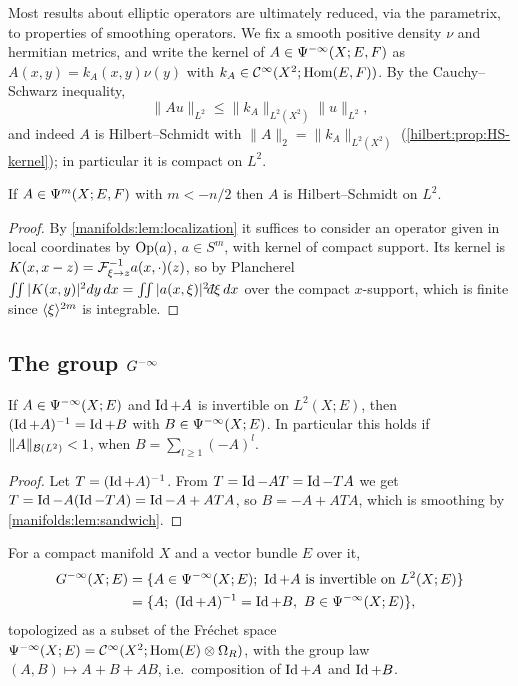 Most results about elliptic operators are ultimately reduced, via the parametrix,
to properties of smoothing operators. We fix a smooth positive density $\nu$ and
hermitian metrics, and write the kernel of $A\in\Psi^{-\infty}(X;E,F)$ as
$A(x,y)=k_A(x,y)\nu(y)$ with $k_A\in\mathcal{C}^\infty(X^2;\operatorname{Hom}(E,F))$. By the Cauchy--Schwarz
inequality,
\begin{equation}\label{manifolds:eq:HS-bound}
\|Au\|_{L^2}\le\|k_A\|_{L^2(X^2)}\|u\|_{L^2},
\end{equation}
and indeed $A$ is Hilbert--Schmidt with $\|A\|_{2}=\|k_A\|_{L^2(X^2)}$
(\cref{hilbert:prop:HS-kernel}); in particular it is compact on $L^2$.

\begin{lemma}\label{manifolds:lem:HS}
If $A\in\Psi^{m}(X;E,F)$ with $m<-n/2$ then $A$ is Hilbert--Schmidt on $L^2$.
\end{lemma}
\begin{proof}
By \cref{manifolds:lem:localization} it suffices to consider an operator given in
local coordinates by $\operatorname{Op}(a)$, $a\in S^m$, with kernel of compact support. Its kernel
is $K(x,x-z)=\mathcal{F}^{-1}_{\xi\to z}a(x,\cdot)(z)$, so by Plancherel
$\int\!\!\int|K(x,y)|^2dy\,dx=\int\!\!\int|a(x,\xi)|^2\dbar\xi\,dx$ over the compact $x$-support, which is
finite since $\langle \xi\rangle^{2m}$ is integrable.
\end{proof}

\subsection{The group $G^{-\infty}$}
\begin{lemma}\label{manifolds:lem:inverse-smoothing}
If $A\in\Psi^{-\infty}(X;E)$ and $\operatorname{Id}+A$ is invertible on $L^2(X;E)$, then
$(\operatorname{Id}+A)^{-1}=\operatorname{Id}+B$ with $B\in\Psi^{-\infty}(X;E)$. In particular this holds if
$\|A\|_{\mathcal{B}(L^2)}<1$, when $B=\sum_{l\ge1}(-A)^l$.
\end{lemma}
\begin{proof}
Let $T=(\operatorname{Id}+A)^{-1}$. From $T=\operatorname{Id}-AT=\operatorname{Id}-TA$ we get $T=\operatorname{Id}-A(\operatorname{Id}-TA)=\operatorname{Id}-A+ATA$, so
$B=-A+ATA$, which is smoothing by \cref{manifolds:lem:sandwich}.
\end{proof}

\begin{definition}\label{manifolds:def:G}
For a compact manifold $X$ and a vector bundle $E$ over it,
\begin{equation*}
\begin{aligned}
G^{-\infty}(X;E)&=\{A\in\Psi^{-\infty}(X;E);\ \operatorname{Id}+A \text{ is invertible on } L^2(X;E)\}\\
&=\{A;\ (\operatorname{Id}+A)^{-1}=\operatorname{Id}+B,\ B\in\Psi^{-\infty}(X;E)\},
\end{aligned}
\end{equation*}
topologized as a subset of the Fr\'echet space
$\Psi^{-\infty}(X;E)=\mathcal{C}^\infty(X^2;\operatorname{Hom}(E)\otimes\Omega_R)$, with the group law
$(A,B)\mapsto A+B+AB$, i.e.\ composition of $\operatorname{Id}+A$ and $\operatorname{Id}+B$.
\end{definition}

